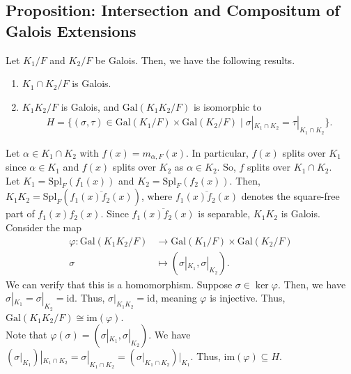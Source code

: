 \documentclass[10pt]{extarticle}
\begin{document}
  \subsection{Proposition: Intersection and Compositum of Galois Extensions}%
  Let $K_1/F$ and $K_2/F$ be Galois. Then, we have the following results.
  \begin{enumerate}[(1)]
    \item $K_1\cap K_2/F$ is Galois.
    \item $K_1K_2/F$ is Galois, and $\text{Gal}(K_1K_2/F)$ is isomorphic to
      \begin{align*}
        H = \{(\sigma,\tau)\in \text{Gal}(K_1/F)\times \text{Gal}(K_2/F)\mid \sigma|_{K_1\cap K_2} = \tau|_{K_1\cap K_2}\}.
      \end{align*}
  \end{enumerate}
  Let $\alpha\in K_1\cap K_2$ with $f(x) = m_{\alpha,F}(x)$. In particular, $f(x)$ splits over $K_1$ since $\alpha\in K_1$ and $f(x)$ splits over $K_2$ as $\alpha\in K_2$. So, $f$ splits over $K_1\cap K_2$.\\

  Let $K_1 = \text{Spl}_{F}(f_1(x))$ and $K_2 = \text{Spl}_{F}(f_2(x))$. Then, $K_1K_2 = \text{Spl}_{F}(\overline{f_1(x)f_2(x)})$, where $\overline{f_1(x)f_2(x)}$ denotes the square-free part of $f_1(x)f_2(x)$. Since $\overline{f_1(x)f_2(x)}$ is separable, $K_1K_2$ is Galois.\\

  Consider the map
  \begin{align*}
    \varphi: \text{Gal}(K_1K_2/F) &\rightarrow \text{Gal}(K_1/F)\times \text{Gal}(K_2/F)\\
    \sigma &\mapsto \left(\sigma|_{K_1},\sigma|_{K_2}\right).
  \end{align*}
  We can verify that this is a homomorphism. Suppose $\sigma \in\ker\varphi$. Then, we have $\sigma|_{K_1} = \sigma|_{K_2} = \text{id}$. Thus, $\sigma|_{K_1K_2} = \text{id}$, meaning $\varphi$ is injective. Thus, $\text{Gal}(K_1K_2/F)\cong \text{im}(\varphi)$.\\

  Note that $\varphi(\sigma) = \left(\sigma|_{K_1},\sigma|_{K_2}\right)$. We have $\left(\sigma|_{K_1}\right)|_{K_1\cap K_2} = \sigma|_{K_1\cap K_2} = \left(\sigma|_{K_1\cap K_2}\right)|_{K_1}$. Thus, $\text{im}(\varphi)\subseteq H$.\\
\end{document}
